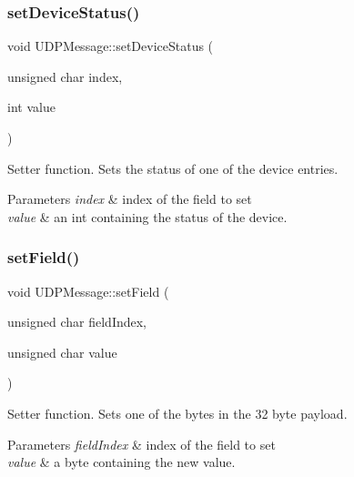 \subsubsection{\texorpdfstring{set\+Device\+Status()}{setDeviceStatus()}}
{\footnotesize\ttfamily void U\+D\+P\+Message\+::set\+Device\+Status (\begin{DoxyParamCaption}\item[{unsigned char}]{index,  }\item[{int}]{value }\end{DoxyParamCaption})\hspace{0.3cm}{\ttfamily [inline]}}

Setter function. Sets the status of one of the device entries. 
\begin{DoxyParams}{Parameters}
{\em index} & index of the field to set \\
\hline
{\em value} & an int containing the status of the device. \\
\hline
\end{DoxyParams}
\mbox{\label{class_u_d_p_message_ad7f1c729cf357be18e6cda695f5e5d99}} 
\subsubsection{\texorpdfstring{set\+Field()}{setField()}}
{\footnotesize\ttfamily void U\+D\+P\+Message\+::set\+Field (\begin{DoxyParamCaption}\item[{unsigned char}]{field\+Index,  }\item[{unsigned char}]{value }\end{DoxyParamCaption})\hspace{0.3cm}{\ttfamily [inline]}}

Setter function. Sets one of the bytes in the 32 byte payload. 
\begin{DoxyParams}{Parameters}
{\em field\+Index} & index of the field to set \\
\hline
{\em value} & a byte containing the new value. \\
\hline
\end{DoxyParams}
\mbox{\label{class_u_d_p_message_a2fcacc64fbb5598848a391c9fd9aa8c2}} 
